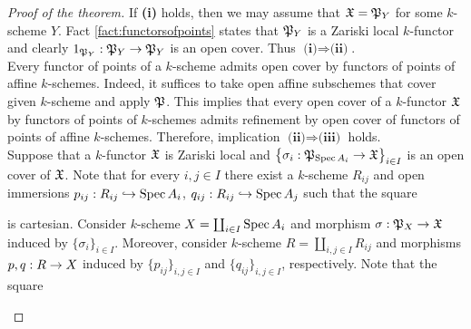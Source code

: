 \begin{proof}[Proof of the theorem]
If \textbf{(i)} holds, then we may assume that ${\mathfrak X}={\mathfrak P}_Y$ for some $k$-scheme $Y$. Fact \ref{fact:functorsofpoints} states that ${\mathfrak P}_Y$ is a Zariski local $k$-functor and clearly $1_{{\mathfrak P}_Y}:{\mathfrak P}_Y\rightarrow {\mathfrak P}_Y$ is an open cover. Thus $\textbf{(i)}\Rightarrow \textbf{(ii)}$.\\
Every functor of points of a $k$-scheme admits open cover by functors of points of affine $k$-schemes. Indeed, it suffices to take open affine subschemes that cover given $k$-scheme and apply ${\mathfrak P}$. This implies that every open cover of a $k$-functor ${\mathfrak X}$ by functors of points of $k$-schemes admits refinement by open cover of functors of points of affine $k$-schemes. Therefore, implication $\textbf{(ii)}\Rightarrow \textbf{(iii)}$ holds.\\
Suppose that a $k$-functor ${\mathfrak X}$ is Zariski local and $\big\{\sigma_i:{\mathfrak P}_{\mathrm{Spec}\, A_i}\rightarrow {\mathfrak X}\big\}_{i\in I}$ is an open cover of ${\mathfrak X}$. Note that for every $i,j\in I$ there exist a $k$-scheme $R_{ij}$ and open immersions $p_{ij}:R_{ij}\hookrightarrow \mathrm{Spec}\, A_i$, $q_{ij}:R_{ij}\hookrightarrow \mathrm{Spec}\, A_j$ such that the square
\begin{center}
\end{center}
is cartesian. Consider $k$-scheme $X = \coprod_{i\in I}\mathrm{Spec}\, A_i$ and morphism $\sigma:{\mathfrak P}_X\rightarrow {\mathfrak X}$ induced by $\{\sigma_i\}_{i\in I}$. Moreover, consider $k$-scheme $R = \coprod_{i,j\in I}R_{ij}$ and morphisms $p,q:R\rightarrow X$ induced by $\{p_{ij}\}_{i,j\in I}$ and $\{q_{ij}\}_{i,j\in I}$, respectively. Note that the square
\begin{center}
\end{center}
\end{proof}
